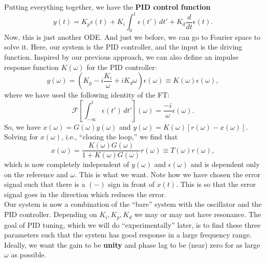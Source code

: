 \documentclass{article}
\theoremstyle{definition}
\newcommand{\F}{\mathcal{F}}
\newcommand{\f}[2]{\frac{#1}{#2}}
\newcommand{\lp}{\left(}
\newcommand{\rp}{\right)}
\newcommand{\lb}{\left[}
\newcommand{\rb}{\right]}
\begin{document}
Putting everything together, we have the \textbf{PID control function}
\begin{equation*}
y(t) = K_p \epsilon(t) + K_i \int_0^t \epsilon(t')\,dt' + K_d \f{d}{dt}\epsilon(t).
\end{equation*}
Now, this is just another ODE. And just we before, we can go to Fourier space to solve it. Here, our system is the PID controller, and the input is the driving function. Inspired by our previous approach, we can also define an impulse response function $K(\omega)$ for the PID controller:
\begin{equation*}
y(\omega) = \lp K_p - i\f{K_i}{\omega} + iK_d\omega \rp \epsilon(\omega) \equiv K(\omega) \epsilon(\omega),
\end{equation*}
where we have used the following identity of the FT:
\begin{equation*}
\F\lb \int_{-\infty}^t \epsilon(t')\,dt' \rb(\omega) = \f{-i}{\omega}\epsilon(\omega).
\end{equation*}
So, we have $x(\omega) = G(\omega)y(\omega)$ and $y(\omega) = K(\omega)[r(\omega) - x(\omega)]$. Solving for $x(\omega)$, i.e., ``closing the loop,'' we find that 
\begin{equation*}
x(\omega)  = \f{K(\omega) G(\omega)}{1+ K(\omega) G(\omega)} r(\omega) \equiv T(\omega) r(\omega),
\end{equation*} 
which is now completely independent of $y(\omega)$ and $\epsilon(\omega)$ and is dependent only on the reference and $\omega$. This is what we want. Note how we have chosen the error signal such that there is a $(-)$ sign in front of $x(t)$. This is so that the error signal goes in the direction which reduces the error. \\

Our system is now a combination of the ``bare'' system with the oscillator and the PID controller. Depending on $K_i, K_p, K_d$ we may or may not have resonance. The goal of PID tuning, which we will do ``experimentally'' later, is to find these three parameters such that the system has good response in a large frequency range. Ideally, we want the gain to be \textbf{unity} and phase lag to be (near) zero for as large $\omega$ as possible.\\
\end{document}
